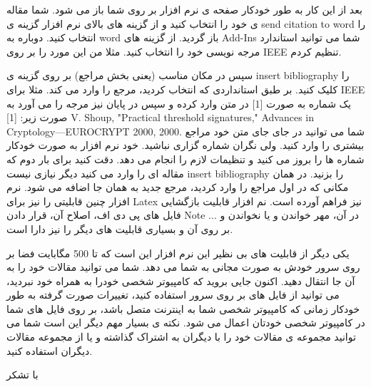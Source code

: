 بعد از این کار به طور خودکار صفحه ی نرم افزار بر روی شما باز می شود. شما مقاله ی خود را انتخاب کنید و از گزینه های بالای نرم افزار گزینه ی  send citation to word را انتخاب کنید. دوباره به word باز گردید. از گزینه های Add-Ins شما می توانید استاندارد مرجه نویسی خود را انتخاب کنید. مثلا من این مورد را بر روی IEEE  تنظیم کردم.



سپس در مکان مناسب (یعنی بخش مراجع) بر روی گزینه ی insert bibliography را کلیک کنید. بر طبق استانداردی که انتخاب کردید، مرجع را وارد می کند. مثلا برای IEEE یک شماره به صورت [1] در متن وارد کرده و سپس در پایان نیز مرجه را می آورد به صورت زیر:
[1] 	 V. Shoup, "Practical threshold signatures," Advances in Cryptology—EUROCRYPT 2000, 2000. 
شما می توانید در جای جای متن خود مراجع بیشتری را وارد کنید. ولی نگران شماره گزاری نباشید. خود نرم افزار به صورت خودکار شماره ها را بروز می کنید و تنظیمات لازم را انجام می دهد. دقت کنید برای بار دوم که مقاله ای را وارد می کنید دیگر نیازی نیست insert bibliography را بزنید. در همان مکانی که در اول مراجع را وارد کردید، مرجع جدید به همان جا اضافه می شود. 
نرم افزار چنین قابلیتی را نیز برای Latex نیز فراهم آورده است. 
نم افزار قابلیت بازگشایی فایل های پی دی اف، اصلاح آن، قرار دادن Note در آن، مهر خواندن و یا نخواندن و ... بر روی آن و بسیاری قابلیت های دیگر را نیز دارا است. 

یکی دیگر از قابلیت های بی نظیر این نرم افزار این است که تا 500 مگابایت فضا بر روی سرور خودش به صورت مجانی به شما می دهد. شما می توانید مقالات خود را به آن جا انتقال دهید. اکنون جایی بروید که کامپیوتر شخصی خودرا به همراه خود نبردید، می توانید از فایل های بر روی سرور استفاده کنید، تغییرات صورت گرفته به طور خودکار زمانی که کامپیوتر شخصی شما به اینترنت متصل باشد، بر روی فایل های شما در کامپیوتر شخصی خودتان اعمال می شود.
نکته ی بسیار مهم دیگر این است شما می توانید مجموعه ی مقالات خود را با دیگران به اشتراک گذاشته و یا از مجموعه مقالات دیگران استفاده کنید.

با تشکر

